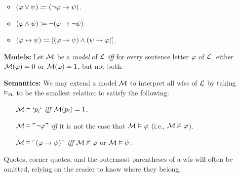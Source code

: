 \documentclass[a4paper, 11pt]{article} %
\begin{document}
\begin{enumerate}[leftmargin=1.2in]
	      \begin{itemize}\small
		      \item $(\varphi \vee \psi) \coloneq (\neg \varphi \rightarrow \psi)$.
		      \item $(\varphi\wedge \psi) \coloneq \neg(\varphi \rightarrow \neg\psi)$.
		      \item $(\varphi\leftrightarrow \psi) \coloneq [(\varphi\rightarrow \psi)\wedge(\psi\rightarrow \varphi)]$.
	      \end{itemize}
	\item[\bf Models:] Let $\mathcal{M}$ be a \textit{model} of $\mathcal{L}$ \textit{iff} for every sentence letter $\varphi$ of $\mathcal{L}$, either $\mathcal{M}(\varphi)=0$ or $\mathcal{M}(\varphi)=1$, but not both.
	\item[\bf Semantics:] We may extend a model $\mathcal{M}$ to interpret all wfss of $\mathcal{L}$ by taking $\vDash_{\textsc{pl}}$ to be the smallest relation to satisfy the following:
	      \begin{itemize}[leftmargin=.15in]\small
		      \item[] $\mathcal{M}\vDash `p_i`$ \textit{iff} $\mathcal{M}(p_i)=1$.
		      \item[] $\mathcal{M}\vDash \ulcorner\neg \varphi\urcorner$ \textit{iff} it is not the case that $\mathcal{M}\vDash \varphi$ (i.e., $\mathcal{M}\nvDash \varphi$). %
		      \item[] $\mathcal{M}\vDash \ulcorner(\varphi \rightarrow \psi)\urcorner$ \textit{iff} $\mathcal{M}\nvDash \varphi$ or $\mathcal{M}\vDash \psi$.
	      \end{itemize}
	      Quotes, corner quotes, and the outermost parentheses of a wfs will often be omitted, relying on the reader to know where they belong.

\end{enumerate}
\end{document}

